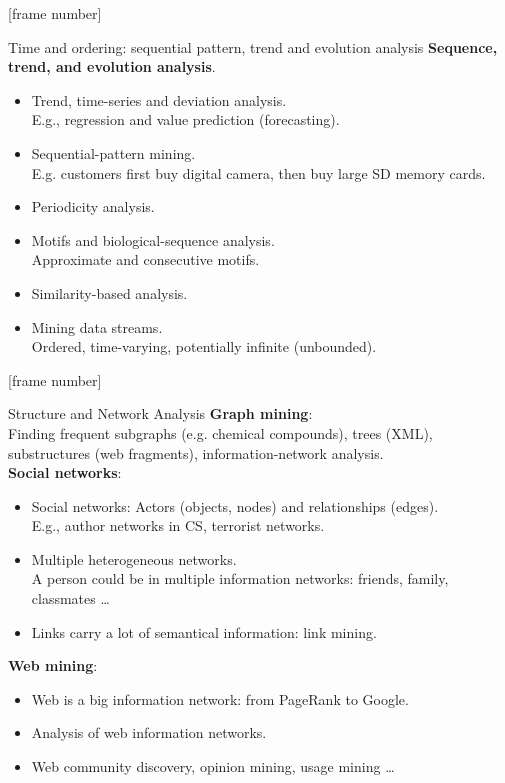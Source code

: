 \documentclass[aspectratio=169,t]{beamer}
\begin{document}
  {
    [frame number]
    \begin{frame}{Time and ordering: sequential pattern, trend and evolution analysis}
    \textbf{Sequence, trend, and evolution analysis}.\\
    \begin{itemize}
        \item Trend, time-series and deviation analysis. \\
              E.g., regression and value prediction (forecasting).
        \item Sequential-pattern mining.\\
              E.g. customers first buy digital camera, then buy large SD memory cards.
        \item Periodicity analysis.
        \item Motifs and biological-sequence analysis.\\
              Approximate and consecutive motifs.
        \item Similarity-based analysis.\\
        \item Mining data streams.\\
              Ordered, time-varying, potentially infinite (unbounded).
    \end{itemize}
    \end{frame}
  }

  {
    [frame number]
    \begin{frame}{Structure and Network Analysis}
    \textbf{Graph mining}:\\
    Finding frequent subgraphs (e.g. chemical compounds), trees (XML), substructures (web fragments), information-network analysis.\\[0.2cm]

    \textbf{Social networks}:
    \begin{itemize}
        \item Social networks: Actors (objects, nodes) and relationships (edges).\\
              E.g., author networks in CS, terrorist networks.
        \item Multiple heterogeneous networks.\\
              A person could be in multiple information networks: friends, family, classmates \ldots
        \item Links carry a lot of semantical information: link mining.
    \end{itemize}

    \textbf{Web mining}:
    \begin{itemize}
        \item Web is a big information network: from PageRank to Google.
        \item Analysis of web information networks.
        \item Web community discovery, opinion mining, usage mining \ldots
    \end{itemize}
    \end{frame}
  }
\end{document}
